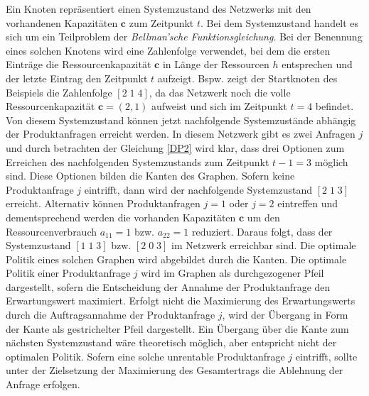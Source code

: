 Ein Knoten repräsentiert einen Systemzustand des Netzwerks mit den vorhandenen Kapazitäten $\textbf{c}$ zum Zeitpunkt $t$. Bei dem Systemzustand handelt es sich um ein Teilproblem der \textit{Bellman'sche Funktionsgleichung}. Bei der Benennung eines solchen Knotens wird eine Zahlenfolge verwendet, bei dem die ersten Einträge die Ressourcenkapazität $\textbf{c}$ in Länge der Ressourcen $h$ entsprechen und der letzte Eintrag den Zeitpunkt $t$ aufzeigt. Bspw. zeigt der Startknoten des Beispiels die Zahlenfolge $[2\;1\;4]$, da das Netzwerk noch die volle Ressourcenkapazität $\textbf{c}=(2,1)$ aufweist und sich im Zeitpunkt $t=4$ befindet. Von diesem Systemzustand können jetzt nachfolgende Systemzustände abhängig der Produktanfragen erreicht werden. In diesem Netzwerk gibt es zwei Anfragen $j$ und durch betrachten der Gleichung \eqref{DP2} wird klar, dass drei Optionen zum Erreichen des nachfolgenden Systemzustands zum Zeitpunkt $t-1=3$ möglich sind. Diese Optionen bilden die Kanten des Graphen. Sofern keine Produktanfrage $j$ eintrifft, dann wird der nachfolgende Systemzustand $[2\;1\;3]$ erreicht. Alternativ können Produktanfragen $j=1$ oder $j=2$ eintreffen und dementsprechend werden die vorhanden Kapazitäten $\textbf{c}$ um den Ressourcenverbrauch $a_{11}=1$ bzw. $a_{22}=1$ reduziert. Daraus folgt, dass der Systemzustand $[1\;1\;3]$ bzw. $[2\;0\;3]$ im Netzwerk erreichbar sind. Die optimale Politik eines solchen Graphen wird abgebildet durch die Kanten. Die optimale Politik einer Produktanfrage $j$ wird im Graphen als durchgezogener Pfeil dargestellt, sofern die Entscheidung der Annahme der Produktanfrage den Erwartungswert maximiert. Erfolgt nicht die Maximierung des Erwartungswerts durch die Auftragsannahme der Produktanfrage $j$, wird der Übergang in Form der Kante als gestrichelter Pfeil dargestellt. Ein Übergang über die Kante zum nächsten Systemzustand wäre theoretisch möglich, aber entspricht nicht der optimalen Politik. Sofern eine solche unrentable Produktanfrage $j$ eintrifft, sollte unter der Zielsetzung der Maximierung des Gesamtertrags die Ablehnung der Anfrage erfolgen.

